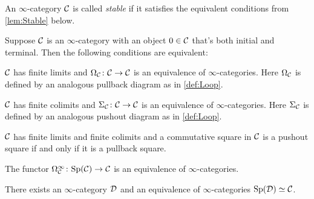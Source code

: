 \begin{defi}\label{def:Stable}
	An $\infty$-category $\mathcal{C}$ is called \emph{stable} if it satisfies the equivalent conditions from \cref{lem:Stable} below.
\end{defi}
\begin{lem}\label{lem:Stable}
	Suppose $\mathcal{C}$ is an $\infty$-category with an object $0\in \mathcal{C}$ that's both initial and terminal. Then the following conditions are equivalent:
	\begin{alphanumerate}
		\item $\mathcal{C}$ has finite limits and $\Omega_{\mathcal{C}}\colon \mathcal{C}\rightarrow\mathcal{C}$ is an equivalence of $\infty$-categories. Here $\Omega_{\mathcal{C}}$ is defined by an analogous pullback diagram as in \cref{def:Loop}.\label{enum:OmegaEquivalence}
		\item $\mathcal{C}$ has finite colimits and $\Sigma_{\mathcal{C}}\colon \mathcal{C}\rightarrow \mathcal{C}$ is an equivalence of $\infty$-categories. Here $\Sigma_{\mathcal{C}}$ is defined by an analogous pushout diagram as in \cref{def:Loop}.\label{enum:SigmaEquivalence}
		\item $\mathcal{C}$ has finite limits and finite colimits and a commutative square in $\mathcal{C}$ is a pushout square if and only if it is a pullback square.\label{enum:PushoutPullback}
		\item The functor $\Omega_{\mathcal{C}}^\infty\colon \mathrm{Sp}(\mathcal{C})\rightarrow \mathcal{C}$ is an equivalence of $\infty$-categories.\label{enum:SpCisC}
		\item There exists an $\infty$-category $\mathcal{D}$ and an equivalence of $\infty$-categories $\mathrm{Sp}(\mathcal{D})\simeq\mathcal{C}$.\label{enum:SpDisC}
	\end{alphanumerate}
\end{lem}
